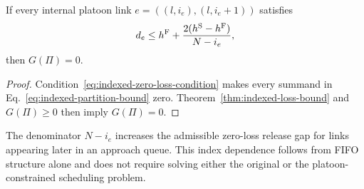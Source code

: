 \begin{corollary}
\label{cor:indexed-zero-loss}
If every internal platoon link
\(e=((l,i_e),(l,i_e+1))\) satisfies
\begin{equation}
d_e
\le
h^{\mathrm{F}}+\frac{2(h^{\mathrm{S}}-h^{\mathrm{F}})}{N-i_e},
\label{eq:indexed-zero-loss-condition}
\end{equation}
then \(G(\Pi)=0\).
\end{corollary}

\begin{proof}
Condition~\eqref{eq:indexed-zero-loss-condition} makes every summand in
Eq.~\eqref{eq:indexed-partition-bound} zero. Theorem~\ref{thm:indexed-loss-bound}
and \(G(\Pi)\ge0\) then imply \(G(\Pi)=0\).
\end{proof}

The denominator \(N-i_e\) increases the admissible zero-loss release gap for
links appearing later in an approach queue. This index dependence follows
from FIFO structure alone and does not require solving either the original or
the platoon-constrained scheduling problem.
